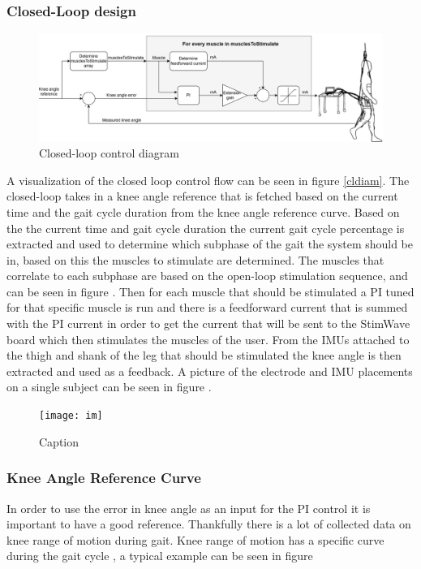 \subsubsection{Closed-Loop design}

\begin{figure} [H]
    \centering
    \includegraphics[width=0.98\linewidth]{images/controldiam3.png}
    \caption{Closed-loop control diagram}
    \label{fig:cldiam}
\end{figure}

A visualization of the closed loop control flow can be seen in figure \ref{cldiam}. The closed-loop takes in a knee angle reference that is fetched based on the current time and the gait cycle duration from the knee angle reference curve. Based on the the current time and gait cycle duration the current gait cycle percentage is extracted and used to determine which subphase of the gait the system should be in, based on this the muscles to stimulate are determined. The muscles that correlate to each subphase are based on the open-loop stimulation sequence, and can be seen in figure . Then for each muscle that should be stimulated a PI tuned for that specific muscle is run and there is a feedforward current that is summed with the PI current in order to get the current that will be sent to the StimWave board which then stimulates the muscles of the user. From the IMUs attached to the thigh and shank of the leg that should be stimulated the knee angle is then extracted and used as a feedback. A picture of the electrode and IMU placements on a single subject can be seen in figure .

\begin{figure}
    \centering
    \texttt{[image: im]}
    \caption{Caption}
    \label{fig:enter-label}
\end{figure}



\subsubsection{Knee Angle Reference Curve}
In order to use the error in knee angle as an input for the PI control it is important to have a good reference. Thankfully there is a lot of collected data on knee range of motion during gait. Knee range of motion has a specific curve during the gait cycle , a typical example can be seen in figure  
\newline 

